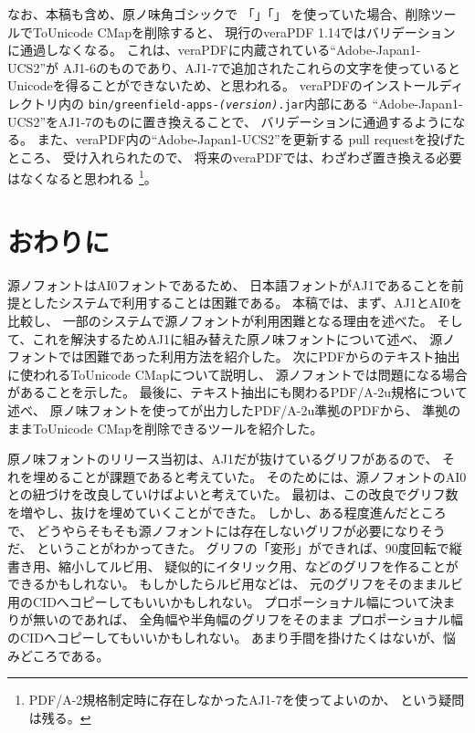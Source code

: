 なお、本稿も含め、原ノ味角ゴシックで
「{\gtfamily {}}」「{\gtfamily {}}」
を使っていた場合、削除ツールでToUnicode CMapを削除すると、
現行のveraPDF 1.14ではバリデーションに通過しなくなる。
これは、veraPDFに内蔵されている``Adobe-Japan1-UCS2''が
AJ1-6のものであり、AJ1-7で追加されたこれらの文字を使っていると
Unicodeを得ることができないため、と思われる。
veraPDFのインストールディレクトリ内の
\texttt{bin/greenfield-apps-\textit{(version)}.jar}内部にある
``Adobe-Japan1-UCS2''をAJ1-7のものに置き換えることで、
バリデーションに通過するようになる。
また、veraPDF内の``Adobe-Japan1-UCS2''を更新する
pull requestを投げたところ、
受け入れられた\cite{verapdf-paser-pr379}ので、
将来のveraPDFでは、わざわざ置き換える必要はなくなると思われる
\footnote{PDF/A-2規格制定時に存在しなかったAJ1-7を使ってよいのか、
  という疑問は残る。}。

\section{おわりに}

源ノフォントはAI0フォントであるため、
日本語フォントがAJ1であることを前提としたシステムで利用することは困難である。
本稿では、まず、AJ1とAI0を比較し、
一部のシステムで源ノフォントが利用困難となる理由を述べた。
そして、これを解決するためAJ1に組み替えた原ノ味フォントについて述べ、
源ノフォントでは困難であった利用方法を紹介した。
次にPDFからのテキスト抽出に使われるToUnicode CMapについて説明し、
源ノフォントでは問題になる場合があることを示した。
最後に、テキスト抽出にも関わるPDF/A-2u規格について述べ、
原ノ味フォントを使って\LuaTeX が出力したPDF/A-2u準拠のPDFから、
準拠のままToUnicode CMapを削除できるツールを紹介した。

原ノ味フォントのリリース当初は、AJ1だが抜けているグリフがあるので、
それを埋めることが課題であると考えていた。
そのためには、源ノフォントのAI0との紐づけを改良していけばよいと考えていた。
最初は、この改良でグリフ数を増やし、抜けを埋めていくことができた。
しかし、ある程度進んだところで、
どうやらそもそも源ノフォントには存在しないグリフが必要になりそうだ、
ということがわかってきた。
グリフの「変形」ができれば、90度回転で縦書き用、縮小してルビ用、
疑似的にイタリック用、などのグリフを作ることができるかもしれない。
もしかしたらルビ用などは、
元のグリフをそのままルビ用のCIDへコピーしてもいいかもしれない。
プロポーショナル幅について決まりが無いのであれば、
全角幅や半角幅のグリフをそのまま
プロポーショナル幅のCIDへコピーしてもいいかもしれない。
あまり手間を掛けたくはないが、悩みどころである。

